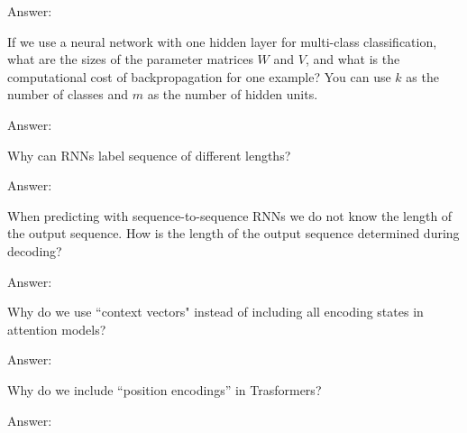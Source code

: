 \documentclass{article}
\newcommand{\ask}[1]{\textcolor{question}{#1}}
\newenvironment{answer}{\par\begingroup\color{answer}Answer: }{\endgroup}
\newcommand{\TODO}{\color{red}{TODO}}
\begin{document}
\begin{qlist}
\begin{answer}\TODO\end{answer}

\item If we use a neural network with one hidden layer for multi-class classification, \ask{what are the sizes of the parameter matrices $W$ and $V$, and what is the computational cost of backpropagation for one example?} You can use $k$ as the number of classes and $m$ as the number of hidden units.
\begin{answer}\TODO\end{answer}

\item \ask{Why can RNNs label sequence of different lengths?}
\begin{answer}\TODO\end{answer}

\item When predicting with sequence-to-sequence RNNs we do not know the length of the output sequence. \ask{How is the length of the output sequence determined during decoding?}
\begin{answer}\TODO\end{answer}


\item \ask{Why do we use ``context vectors" instead of including all encoding states in attention models?}
\begin{answer}\TODO\end{answer}

\item \ask{Why do we include ``position encodings'' in Trasformers?}
\begin{answer}\TODO\end{answer}

\end{qlist}
\end{document}
